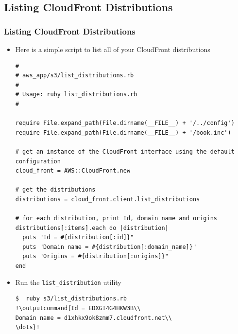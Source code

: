 \documentclass{beamer}
\newcommand{\outputcommand}[1]{\color{darkgreen}{#1}}
\begin{document}
\subsection{Listing CloudFront Distributions}
\begin{frame}
\frametitle{Listing CloudFront Distributions}
\begin{itemize}
\item Here is a simple script to list all of your CloudFront distributions

\lstset{language=Ruby, style=eclipse}
\begin{lstlisting}[escapechar=!]
#
# aws_app/s3/list_distributions.rb
#
# Usage: ruby list_distributions.rb
#

require File.expand_path(File.dirname(__FILE__) + '/../config')
require File.expand_path(File.dirname(__FILE__) + '/book.inc')

# get an instance of the CloudFront interface using the default configuration
cloud_front = AWS::CloudFront.new

# get the distributions
distributions = cloud_front.client.list_distributions

# for each distribution, print Id, domain name and origins
distributions[:items].each do |distribution|
  puts "Id = #{distribution[:id]}"
  puts "Domain name = #{distribution[:domain_name]}"
  puts "Origins = #{distribution[:origins]}"
end
\end{lstlisting}

\item Run the \texttt{list\_distribution} utility
\lstset{language=shell}
\begin{lstlisting}[escapechar=!]
$  ruby s3/list_distributions.rb 
!\outputcommand{Id = EDXGI4G4HKW3B\\
Domain name = d1xhkx9ok8zmm7.cloudfront.net\\
\dots}!
\end{lstlisting} 
\end{itemize}
\end{frame}
\end{document}
